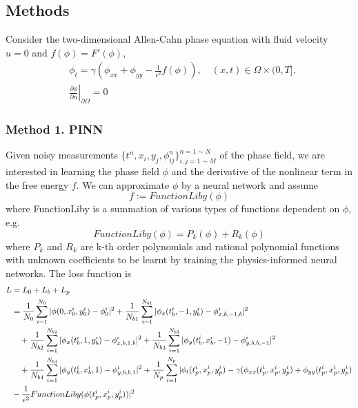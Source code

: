 \subsection{Methods}
Consider the two-dimensional Allen-Cahn phase equation with fluid velocity $u = 0$ and $f( \phi ) = F'( \phi )$,
\begin{equation}
\begin{aligned}
& \phi_t = \gamma (\phi_{xx} + \phi_{yy} - \frac{1}{\epsilon^2} f(\phi)), \quad(x, t) \in \Omega \times(0, T], \\
& \left.\frac{\partial \phi}{\partial n}\right|_{\partial \Omega}=0
\end{aligned}
\end{equation}

\subsubsection{Method 1. PINN}
Given noisy measurements $\{t^{n}, x_{i}, y_{j}, \phi_{ij}^{n} \}^{n = 1 \sim N}_{i,j = 1 \sim M}$ of the phase field, we are interested in learning the phase field $\phi$ and the derivative of the nonlinear term in the free energy $f$. We can approximate $\phi$ by a neural network and assume 
\[
f := FunctionLiby(\phi)
\]
where FunctionLiby is a summation of various types of functions dependent on $\phi$, e.g. \[ FunctionLiby(\phi) = P_k (\phi) + R_k (\phi)\] where $P_k$ and $R_k$ are k-th order polynomials and rational polynomial functions with unknown coefficients to be learnt by training the physics-informed neural networks. The loss function is
\begin{equation*}
    \begin{align}
        L &= L_0 + L_b + L_p \notag \\
        &= \frac{1}{N_{0}} \sum^{N_{0}}_{i=1} |\phi(0,x^{i}_{0}, y^{i}_{0}) - \phi^{i}_{0}|^2 
        + \frac{1}{N_{b1}} \sum^{N_{b1}}_{i=1} |\phi_{x}(t^{i}_{b},-1, y^{i}_{b}) - \phi^{i}_{x,b,-1,b}|^2 \notag \\
        &\quad + \frac{1}{N_{b2}} \sum^{N_{b2}}_{i=1} |\phi_{x}(t^{i}_{b},1, y^{i}_{b}) - \phi^{i}_{x,b,1,b}|^2 
        + \frac{1}{N_{b3}} \sum^{N_{b3}}_{i=1} |\phi_{y}(t^{i}_{b},x^{i}_{b}, -1) - \phi^{i}_{y,b,b,-1}|^2 \notag \\
        &\quad + \frac{1}{N_{b4}} \sum^{N_{b4}}_{i=1} |\phi_{y}(t^{i}_{b},x^{i}_{b}, 1) - \phi^{i}_{y,b,b,1}|^2 + \frac{1}{N_{p}} \sum^{N_{p}}_{i=1} |\phi_{t}(t^{i}_{p}, x^{i}_{p}, y^{i}_{p}) - \gamma (\phi_{xx}(t^{i}_{p}, x^{i}_{p}, y^{i}_{p}) + \phi_{yy}(t^{i}_{p}, x^{i}_{p}, y^{i}_{p}) \\
        &- \frac{1}{\epsilon^2} FunctionLiby( \phi(t^{i}_{p}, x^{i}_{p}, y^{i}_{p}) ) |^2
    \end{align}
\end{equation*}
